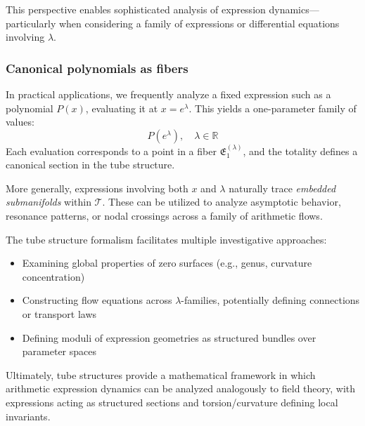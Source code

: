This perspective enables sophisticated analysis of expression dynamics—particularly when considering a family of expressions or differential equations involving $\lambda$.

\subsubsection{Canonical polynomials as fibers}

In practical applications, we frequently analyze a fixed expression such as a polynomial $P(x)$, evaluating it at $x=e^\lambda$. This yields a one-parameter family of values:
\begin{equation}
P(e^\lambda), \quad \lambda \in \mathbb{R}
\end{equation}
Each evaluation corresponds to a point in a fiber $\mathfrak{E}_1^{(\lambda)}$, and the totality defines a canonical section in the tube structure.

More generally, expressions involving both $x$ and $\lambda$ naturally trace \emph{embedded submanifolds} within $\mathcal{T}$. These can be utilized to analyze asymptotic behavior, resonance patterns, or nodal crossings across a family of arithmetic flows.

The tube structure formalism facilitates multiple investigative approaches:

\begin{itemize}
\item Examining global properties of zero surfaces (e.g., genus, curvature concentration)
\item Constructing flow equations across $\lambda$-families, potentially defining connections or transport laws
\item Defining moduli of expression geometries as structured bundles over parameter spaces
\end{itemize}

Ultimately, tube structures provide a mathematical framework in which arithmetic expression dynamics can be analyzed analogously to field theory, with expressions acting as structured sections and torsion/curvature defining local invariants.
